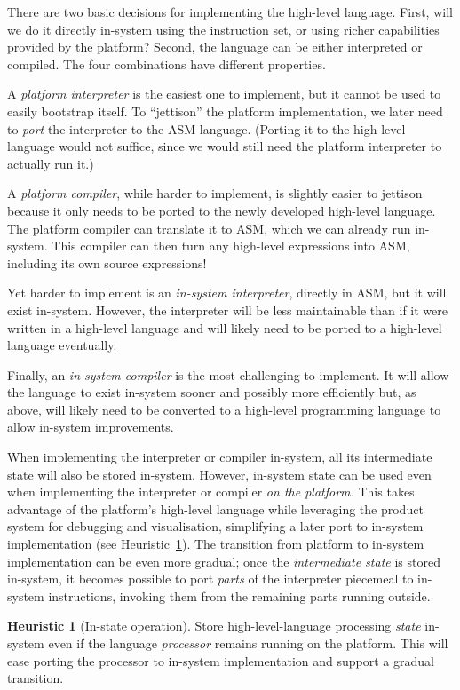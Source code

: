\documentclass[ twoside,openright,titlepage,numbers=noenddot,headinclude,footinclude,cleardoublepage=empty,abstract=on,
                BCOR=5mm,paper=a4,fontsize=11pt
                ]{scrreprt}
\theoremstyle{definition}
\newtheorem{heuristic}{Heuristic}
\begin{document}
There are two basic decisions for implementing the high-level language.
First, will we do it directly in-system using the instruction set, or
using richer capabilities provided by the platform? Second, the language
can be either interpreted or compiled. The four combinations have
different properties.

A \emph{platform interpreter} is the easiest one to implement, but it
cannot be used to easily bootstrap itself. To ``jettison'' the platform
implementation, we later need to \emph{port} the interpreter to the ASM
language. (Porting it to the high-level language would not suffice,
since we would still need the platform interpreter to actually run it.)

A \emph{platform compiler}, while harder to implement, is slightly
easier to jettison because it only needs to be ported to the newly
developed high-level language. The platform compiler can translate it to
ASM, which we can already run in-system. This compiler can then turn any
high-level expressions into ASM, including its own source expressions!

Yet harder to implement is an \emph{in-system interpreter}, directly in
ASM, but it will exist in-system. However, the interpreter will be less
maintainable than if it were written in a high-level language and will
likely need to be ported to a high-level language eventually.

Finally, an \emph{in-system compiler} is the most challenging to
implement. It will allow the language to exist in-system sooner and
possibly more efficiently but, as above, will likely need to be
converted to a high-level programming language to allow in-system
improvements.

When implementing the interpreter or compiler in-system, all its
intermediate state will also be stored in-system. However, in-system
state can be used even when implementing the interpreter or compiler
\emph{on the platform.} This takes advantage of the platform's
high-level language while leveraging the product system for debugging
and visualisation, simplifying a later port to in-system implementation
(see Heuristic~\ref{in-state-op}). The transition from platform to
in-system implementation can be even more gradual; once the
\emph{intermediate state} is stored in-system, it becomes possible to
port \emph{parts} of the interpreter piecemeal to in-system
instructions, invoking them from the remaining parts running outside.

\begin{heuristic}[In-state operation]
\label{in-state-op}
Store high-level-language processing \emph{state} in-system even if the language \emph{processor} remains running on the platform. This will ease porting the processor to in-system implementation and support a gradual transition.
\end{heuristic}
\end{document}
